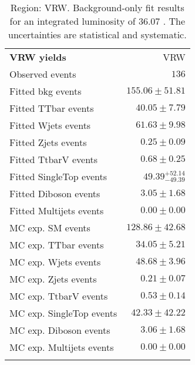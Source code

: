 

\begin{table}[h!]
\caption{Region: VRW. Background-only fit results for an integrated luminosity of 36.07 \ifb. The uncertainties are statistical and systematic.
}
\label{table.bkgonly.VRW}
\begin{center}
\setlength{\tabcolsep}{0.0pc}
{\small
\begin{tabular*}{\textwidth}{@{\extracolsep{\fill}}lr}
\noalign{\smallskip}\hline\noalign{\smallskip}
{\bf VRW yields}           & VRW              \\[-0.05cm]
\noalign{\smallskip}\hline\noalign{\smallskip}
Observed events          & $136$                    \\
\noalign{\smallskip}\hline\noalign{\smallskip}
Fitted bkg events         & $155.06 \pm 51.81$              \\
\noalign{\smallskip}\hline\noalign{\smallskip}
        Fitted TTbar events         & $40.05 \pm 7.79$              \\
        Fitted Wjets events         & $61.63 \pm 9.98$              \\
        Fitted Zjets events         & $0.25 \pm 0.09$              \\
        Fitted TtbarV events         & $0.68 \pm 0.25$              \\
        Fitted SingleTop events         & $49.39_{-49.39}^{+52.14}$              \\
        Fitted Diboson events         & $3.05 \pm 1.68$              \\
        Fitted Multijets events         & $0.00 \pm 0.00$              \\
 \noalign{\smallskip}\hline\noalign{\smallskip}
MC exp. SM events              & $128.86 \pm 42.68$              \\
\noalign{\smallskip}\hline\noalign{\smallskip}
        MC exp. TTbar events         & $34.05 \pm 5.21$              \\
        MC exp. Wjets events         & $48.68 \pm 3.96$              \\
        MC exp. Zjets events         & $0.21 \pm 0.07$              \\
        MC exp. TtbarV events         & $0.53 \pm 0.14$              \\
        MC exp. SingleTop events         & $42.33 \pm 42.22$              \\
        MC exp. Diboson events         & $3.06 \pm 1.68$              \\
        MC exp. Multijets events         & $0.00 \pm 0.00$              \\
\noalign{\smallskip}\hline\noalign{\smallskip}
\end{tabular*}
}
\end{center}
\end{table}
%